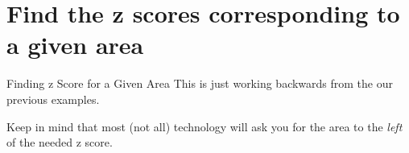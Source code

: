 \documentclass[t]{beamer}
\begin{document}

\section{Find the z scores corresponding to a given area}

\begin{frame}{Finding z Score for a Given Area}
This is just working backwards from the our previous examples.	\newline\\	\pause

Keep in mind that most (not all) technology will ask you for the area to the \emph{left} of the needed z score.
\end{frame}
\end{document}
